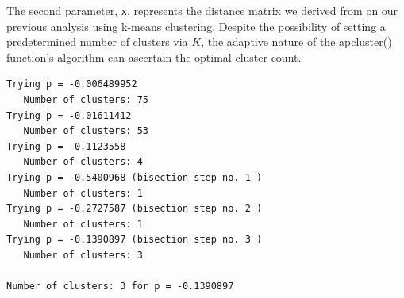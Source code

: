 The second parameter, \texttt{x}, represents the distance matrix we
derived from on our previous analysis using k-means clustering. Despite the
possibility of setting a predetermined number of clusters via \(K\), the
adaptive nature of the apcluster() function's algorithm can ascertain
the optimal cluster count.

\begin{Shaded}
\begin{Highlighting}[]


\OtherTok{\textless{}{-}} \NormalTok{) }

\OtherTok{\textless{}{-}} \NormalTok{(}\NormalTok{)}
\end{Highlighting}
\end{Shaded}

\begin{verbatim}
Trying p = -0.006489952 
   Number of clusters: 75 
Trying p = -0.01611412 
   Number of clusters: 53 
Trying p = -0.1123558 
   Number of clusters: 4 
Trying p = -0.5400968 (bisection step no. 1 )
   Number of clusters: 1 
Trying p = -0.2727587 (bisection step no. 2 )
   Number of clusters: 1 
Trying p = -0.1390897 (bisection step no. 3 )
   Number of clusters: 3 

Number of clusters: 3 for p = -0.1390897 
\end{verbatim}

\begin{Shaded}
\begin{Highlighting}[]
\OtherTok{\textless{}{-}} 

\NormalTok{(}\NormalTok{(} \NormalTok{(docs)[apckmelt}\SpecialCharTok{$}\NormalTok{value,], }\SpecialCharTok{$}
              \NormalTok{,}
              \NormalTok{)}
\end{Highlighting}
\end{Shaded}

